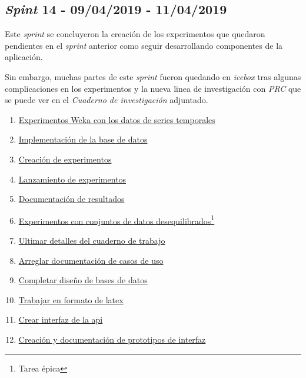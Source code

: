 \subsection{\textit{Spint} 14 - 09/04/2019 - 11/04/2019 }
Este \textit{sprint} se concluyeron la creación de los experimentos que quedaron pendientes en el \textit{sprint} anterior como seguir desarrollando componentes de la aplicación. 

Sin embargo, muchas partes de este \textit{sprint} fueron quedando en \textit{icebox} tras algunas complicaciones en los experimentos y la nueva linea de investigación con \textit{PRC} que se puede ver en el \textit{Cuaderno de investigación} adjuntado. 

\begin{enumerate}\addtocounter{enumi}{50}
	\item
	\href{https://github.com/jlgarridol/TFG-SmartBeds/issues/51}{Experimentos Weka con los datos de series temporales}
	\addtocounter{enumi}{3}
	\item
	\href{https://github.com/jlgarridol/TFG-SmartBeds/issues/55}{Implementación de la base de datos}
	\addtocounter{enumi}{2}
	\item
	\href{https://github.com/jlgarridol/TFG-SmartBeds/issues/58}{Creación de experimentos}
	\item
	\href{https://github.com/jlgarridol/TFG-SmartBeds/issues/59}{Lanzamiento de experimentos}
	\item
	\href{https://github.com/jlgarridol/TFG-SmartBeds/issues/60}{Documentación de resultados}
	\item
	\href{https://github.com/jlgarridol/TFG-SmartBeds/issues/61}{Experimentos con conjuntos de datos desequilibrados\footnote{Tarea épica}}
	\item
	\href{https://github.com/jlgarridol/TFG-SmartBeds/issues/62}{Ultimar detalles del cuaderno de trabajo}
	\item
	\href{https://github.com/jlgarridol/TFG-SmartBeds/issues/63}{Arreglar documentación de casos de uso}
	\item
	\href{https://github.com/jlgarridol/TFG-SmartBeds/issues/64}{Completar diseño de bases de datos}
	\item
	\href{https://github.com/jlgarridol/TFG-SmartBeds/issues/65}{Trabajar en formato de latex}
	\item 
	\href{https://github.com/jlgarridol/TFG-SmartBeds/issues/66}{Crear interfaz de la api}
	\item 
	\href{https://github.com/jlgarridol/TFG-SmartBeds/issues/67}{Creación y documentación de prototipos de interfaz}
\end{enumerate}

